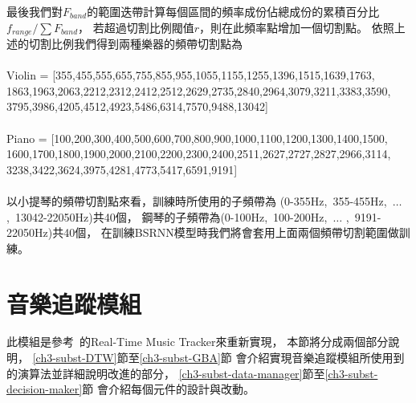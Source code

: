 \documentclass[class=NCU_thesis, crop=false]{standalone}
\begin{document}
最後我們對$F_{band}$的範圍迭帶計算每個區間的頻率成份佔總成份的累積百分比$f_{range}/\sum F_{band}$，
若超過切割比例閥值$r$，則在此頻率點增加一個切割點。
依照上述的切割比例我們得到兩種樂器的頻帶切割點為 \\
\\
Violin = [355,455,555,655,755,855,955,1055,1155,1255,1396,1515,1639,1763,\\
1863,1963,2063,2212,2312,2412,2512,2629,2735,2840,2964,3079,3211,3383,3590,\\
3795,3986,4205,4512,4923,5486,6314,7570,9488,13042]\\
\\
Piano = [100,200,300,400,500,600,700,800,900,1000,1100,1200,1300,1400,1500,\\
1600,1700,1800,1900,2000,2100,2200,2300,2400,2511,2627,2727,2827,2966,3114,\\
3238,3422,3624,3975,4281,4773,5417,6591,9191]\\
\\
以小提琴的頻帶切割點來看，訓練時所使用的子頻帶為
(0-355Hz,\ 355-455Hz,\ $\dots$ ,\ 13042-22050Hz)共40個，
鋼琴的子頻帶為(0-100Hz,\ 100-200Hz,\ $\dots$ ,\ 9191-22050Hz)共40個，
在訓練BSRNN模型時我們將會套用上面兩個頻帶切割範圍做訓練。

\pagebreak

\section{音樂追蹤模組} \label{ch3-st-music-tracking-module}
此模組是參考~\cite{Lin2020AHumanComputerDuetSystem}的Real-Time Music Tracker來重新實現，
本節將分成兩個部分說明，
\ref{ch3-subst-DTW}節至\ref{ch3-subst-GBA}節
會介紹實現音樂追蹤模組所使用到的演算法並詳細說明改進的部分，
\ref{ch3-subst-data-manager}節至\ref{ch3-subst-decision-maker}節
會介紹每個元件的設計與改動。
\end{document}
